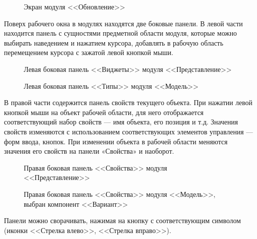 \begin{figure}[ht]
	\centering
	\caption{Экран модуля <<Обновление>>}
	\label{fig:update_screen}
\end{figure}

\FloatBarrier

Поверх рабочего окна в модулях находятся две боковые панели.
В левой части находится панель с сущностями предметной области модуля,
которые можно выбирать наведением и нажатием курсора,
добавлять в рабочую область перемещением курсора с зажатой левой кнопкой мыши.

\begin{figure}[ht]
	\centering
	\caption{Левая боковая панель <<Виджеты>> модуля <<Представление>>}
	\label{fig:widgets_panel}
\end{figure}

\begin{figure}[ht]
	\centering
	\caption{Левая боковая панель <<Типы>> модуля <<Модель>>}
	\label{fig:model_types}
\end{figure}

\FloatBarrier

В правой части содержится панель свойств текущего объекта.
При нажатии левой кнопкой мыши на объект рабочей области,
для него отображается соответствующий набор свойств –-- имя объекта, его позиция и т.д.
Значения свойств изменяются с использованием соответствующих элементов управления --– форм ввода, кнопок.
При изменении объекта в рабочей области меняются значения его свойств на панели «Свойства» и наоборот.

\begin{figure}[ht]
	\centering
	\caption{Правая боковая панель <<Свойства>> модуля <<Представление>>}
	\label{fig:view_properties}
\end{figure}

\begin{figure}[ht]
	\centering
	\caption{Правая боковая панель <<Свойства>> модуля <<Модель>>, выбран компонент <<Вариант>>}
	\label{fig:model_properties}
\end{figure}

\FloatBarrier

Панели можно сворачивать, нажимая на кнопку с соответствующим символом (иконки <<Стрелка влево>>, <<Стрелка вправо>>).

